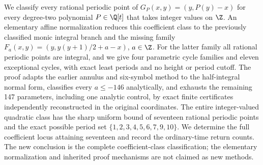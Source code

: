 We classify every rational periodic point of
$G_P(x,y)=(y,P(y)-x)$ for every degree-two polynomial
$P\in\Q[t]$ that takes integer values on $\Z$.
An elementary affine normalization reduces this coefficient class to
the previously classified monic integral branch and the missing family
$F_a(x,y)=(y,y(y+1)/2+a-x)$, $a\in\Z$.
For the latter family all rational periodic points are integral, and
we give four parametric cycle families and eleven exceptional cycles,
with exact least periods and no height or period cutoff.
The proof adapts the earlier annulus and six-symbol method to the
half-integral normal form, classifies every $a\le-146$ analytically,
and exhausts the remaining 147 parameters, including one analytic
control, by exact finite certificates independently reconstructed in
the original coordinates.
The entire integer-valued quadratic class has the sharp uniform bound
of seventeen rational periodic points and the exact possible period set
$\{1,2,3,4,5,6,7,9,10\}$.
We determine the full coefficient locus attaining seventeen and record
the ordinary-time return counts.
The new conclusion is the complete coefficient-class classification;
the elementary normalization and inherited proof mechanisms are not
claimed as new methods.
